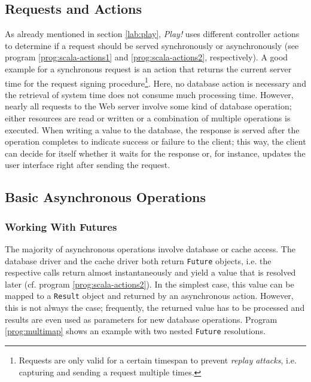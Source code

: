 \subsection{Requests and Actions}
As already mentioned in section \ref{lab:play}, \textit{Play!} uses different controller actions to determine if a request should be served synchronously or asynchronously (see program \ref{prog:scala-actions1} and \ref{prog:scala-actions2}, respectively). A good example for a synchronous request is an action that returns the current server time for the request signing procedure\footnote{Requests are only valid for a certain timespan to prevent \textit{replay attacks}, i.e. capturing and sending a request multiple times.}. Here, no database action is necessary and the retrieval of system time does not consume much processing time. However, nearly all requests to the Web server involve some kind of database operation; either resources are read or written or a combination of multiple operations is executed. When writing a value to the database, the response is served after the operation completes to indicate success or failure to the client; this way, the client can decide for itself whether it waits for the response or, for instance, updates the user interface right after sending the request.

\subsection{Basic Asynchronous Operations}
\subsubsection*{Working With Futures}
The majority of asynchronous operations involve database or cache access. The database driver and the cache driver both return \texttt{Future} objects, i.e. the respective calls return almost instantaneously and yield a value that is resolved later (cf. program \ref{prog:scala-actions2}). In the simplest case, this value can be mapped to a \texttt{Result} object and returned by an asynchronous action. However, this is not always the case; frequently, the returned value has to be processed and results are even used as parameters for new database operations. Program \ref{prog:multimap} shows an example with two nested \texttt{Future} resolutions.

